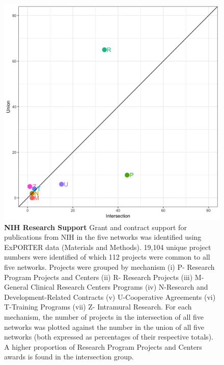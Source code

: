 \documentclass[10pt,letterpaper]{article}
\begin{document}
\begin{figure}[!h]
\centering
\includegraphics[scale=0.1]{proj_percent.png}
\caption{{\bf NIH Research Support} Grant and contract support for publications from NIH in the five networks was identified using ExPORTER data (Materials and Methods). 19,104 unique project numbers were identified of which 112 projects were common to all five networks. Projects were grouped by mechanism (i) P-  Research Program Projects and Centers (ii) R- Research Projects (iii) M-General Clinical Research Centers Programs (iv) N-Research and Development-Related Contracts (v) U-Cooperative Agreements (vi) T-Training Programs (vii) Z- Intramural Research. For each mechanism, the number of projects in the intersection of all five networks was plotted against the number in the union of all five networks (both expressed as percentages of their respective totals). A higher proportion of Research Program Projects and Centers awards is found in the intersection group.}
\label{fig4}
\end{figure}
\clearpage
\end{document}
